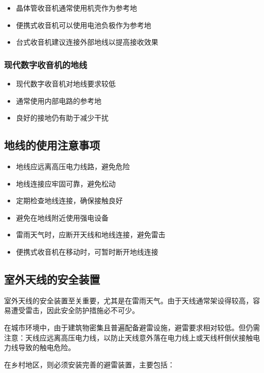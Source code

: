 \documentclass[12pt,UTF8]{ctexbook}
\begin{document}
\begin{itemize}[leftmargin=3.5em]
    \item 晶体管收音机通常使用机壳作为参考地
    \item 便携式收音机可以使用电池负极作为参考地
    \item 台式收音机建议连接外部地线以提高接收效果
\end{itemize}

\subsubsection{现代数字收音机的地线}

\begin{itemize}[leftmargin=3.5em]
    \item 现代数字收音机对地线要求较低
    \item 通常使用内部电路的参考地
    \item 良好的接地仍有助于减少干扰
\end{itemize}

\subsection{地线的使用注意事项}

\begin{itemize}[leftmargin=3.5em]
    \item 地线应远离高压电力线路，避免危险
    \item 地线连接应牢固可靠，避免松动
    \item 定期检查地线连接，确保接触良好
    \item 避免在地线附近使用强电设备
    \item 雷雨天气时，应断开天线和地线连接，避免雷击
    \item 便携式收音机在移动时，可暂时断开地线连接
\end{itemize}

\subsection{室外天线的安全装置}

室外天线的安全装置至关重要，尤其是在雷雨天气。由于天线通常架设得较高，容易遭受雷击，因此安全防护措施必不可少。

在城市环境中，由于建筑物密集且普遍配备避雷设施，避雷要求相对较低。但仍需注意：天线应远离高压电力线，以防止天线意外落在电力线上或天线杆倒伏接触电力线导致的触电危险。

在乡村地区，则必须安装完善的避雷装置，主要包括：
\end{document}
